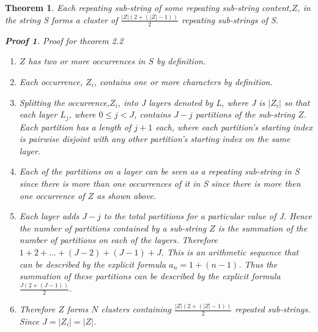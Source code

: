 \documentclass[12pt]{article}
\newtheorem{thm}{Theorem}[section]
\newtheorem{prf}{Proof}[section]
\begin{document}
\begin{flushleft}
	\begin{thm}
	Each repeating sub-string of some repeating sub-string content,$Z$, in the string S forms a cluster of $\frac{|Z|(2 + (|Z|-1))}{2}$ repeating sub-strings of S.
		\begin{prf} Proof for theorem 2.2		
			\begin{enumerate}
				\item $Z$ has two or more occurrences in $S$ by definition.
				\item Each occurrence, $Z_{i}$, contains one or more characters by definition.
				\item Splitting the occurrence,$Z_{i}$, into J layers denoted by L, where J is $|Z_{i}|$ so that each layer $L_{j}$, where $0 \leq j < J $, contains $J - j$ partitions of the sub-string $Z$. Each partition has a length of $j + 1$ each, where each partition's starting index is pairwise disjoint with any other partition's starting index on the same layer.
				\item Each of the partitions on a layer can be seen as a repeating sub-string in S since there is more than one occurrences of it in S since there is more then one occurrence of $Z$ as shown above. 
				\item Each layer adds $J - j$ to the total partitions for a particular value of J. Hence the number of partitions contained by a sub-string $Z$ is the summation of the number of partitions on each of the layers. Therefore $1 + 2 + ... + (J - 2) + (J - 1) + J$. This is an arithmetic sequence that can be described by the explicit formula $a_{n} = 1 + (n - 1)$. Thus the summation of these partitions can be described by the explicit formula $\frac{J(2 + (J-1))}{2}$. 
				\item Therefore $Z$ forms $N$ clusters containing $\frac{|Z|(2 + (|Z|-1))}{2}$ repeated sub-strings. Since $J = |Z_{i}| = |Z|$.		      
			\end{enumerate}
		\end{prf}	
	\end{thm}
	

\end{flushleft}
\end{document}
